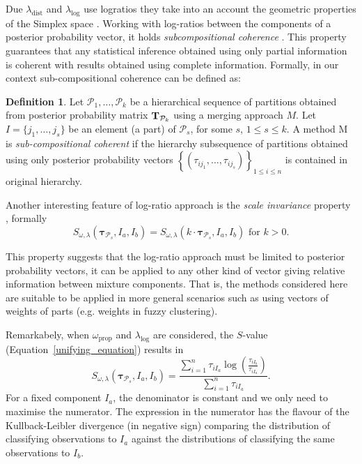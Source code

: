 \documentclass[submit]{smj}
\theoremstyle{definition}
\newtheorem{defn}{Definition}[section]
\newcommand{\m}[1]{\boldsymbol{#1}}
\begin{document}
Due $\lambda_{\text{dist}}$ and $\lambda_{\log}$ use logratios they take into an account the geometric properties of the Simplex space \citep{aitchison2002simplicial}.  Working with log-ratios between the components of a posterior probability vector, it holds \emph{subcompositional coherence}  \citep{aitchison1986statistical}. This property guarantees that any statistical inference obtained using only partial information is coherent with results obtained using complete information. Formally, in our context sub-compositional coherence can be defined as:

\begin{defn}
Let $\mathcal{P}_1, \dots, \mathcal{P}_k$ be a hierarchical sequence of partitions obtained from posterior probability matrix $\text{\textbf{T}}_{\mathcal{P}_k}$ using a merging approach $M$. Let $I = \{j_1, \dots, j_s\}$ be an element (a part) of $\mathcal{P}_s$, for some $s$, $1\leq s \leq k$. A method M is \emph{sub-compositional coherent} if the hierarchy subsequence of partitions obtained  using only posterior probability vectors $\left\{ \left(\tau_{ij_1}, \dots, \tau_{ij_s} \right)\right\}_{1\leq i \leq n}$ is contained in original hierarchy.
\end{defn}

Another interesting feature of log-ratio approach is the \emph{scale invariance} property \citep{aitchison1986statistical}, formally
\[
S_{\omega, \lambda}( \m\tau_{\mathcal{P}_s},  I_a,  I_b) = S_{\omega, \lambda}(k\cdot \m\tau_{\mathcal{P}_s},  I_a,  I_b) \text{ for $k>0$.}
\] 

This property suggests that the log-ratio approach must be limited to posterior probability vectors, it can be applied to any other kind of vector giving relative information between mixture components. That is, the methods considered here are suitable to be applied in more general scenarios such as using vectors of weights of parts (e.g. weights in fuzzy clustering).

Remarkabely, when $\omega_{\text{prop}}$ and $\lambda_{\log}$ are considered, the $S$-value (Equation~\ref{unifying_equation}) results in
\[
S_{\omega, \lambda}( \m\tau_{\mathcal{P}_s},  I_a,  I_b) = \frac{\sum_{i=1}^n \tau_{iI_a}  \log \left(\frac{ \tau_{iI_b} }{ \tau_{iI_a} }\right)}{\sum_{i=1}^n \tau_{iI_a}}.
\]
For a fixed component $I_a$, the denominator is constant and we only need to maximise the numerator. The expression in the numerator has the flavour of the Kullback-Leibler divergence (in negative sign) comparing the distribution of classifying observations to $I_a$ against the distributions of classifying the same observations to $I_b$.
\end{document}
